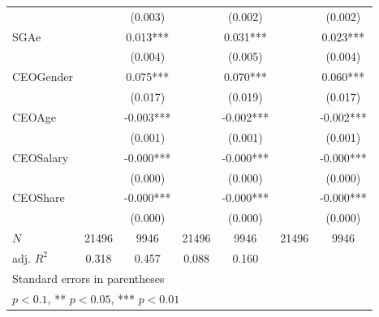 \begin{table}[htbp]
\begin{tabular}{l*{6}{c}}
            &               &     (0.003)   &               &     (0.002)   &               &     (0.002)   \\
[1em]
SGAe        &               &       0.013***&               &       0.031***&               &       0.023***\\
            &               &     (0.004)   &               &     (0.005)   &               &     (0.004)   \\
[1em]
CEOGender   &               &       0.075***&               &       0.070***&               &       0.060***\\
            &               &     (0.017)   &               &     (0.019)   &               &     (0.017)   \\
[1em]
CEOAge      &               &      -0.003***&               &      -0.002***&               &      -0.002***\\
            &               &     (0.001)   &               &     (0.001)   &               &     (0.001)   \\
[1em]
CEOSalary   &               &      -0.000***&               &      -0.000***&               &      -0.000***\\
            &               &     (0.000)   &               &     (0.000)   &               &     (0.000)   \\
[1em]
CEOShare    &               &      -0.000***&               &      -0.000***&               &      -0.000***\\
            &               &     (0.000)   &               &     (0.000)   &               &     (0.000)   \\
\hline
\(N\)       &       21496   &        9946   &       21496   &        9946   &       21496   &        9946   \\
adj. \(R^{2}\)&       0.318   &       0.457   &       0.088   &       0.160   &               &               \\
\hline\hline
\multicolumn{7}{l}{\footnotesize Standard errors in parentheses}\\
\multicolumn{7}{l}{\footnotesize * \(p<0.1\), ** \(p<0.05\), *** \(p<0.01\)}\\
\end{tabular}
\end{table}
